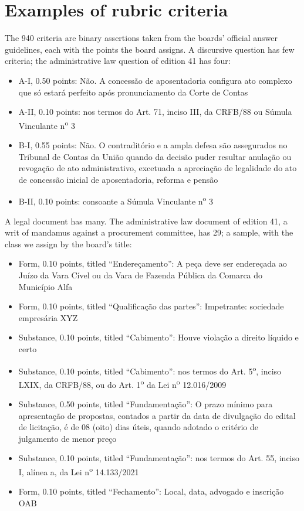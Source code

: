 \documentclass{IOS-Book-Article}
\begin{document}
\section{Examples of rubric criteria}
The 940 criteria are binary assertions taken from the boards' official answer guidelines, each with the points the board assigns. A discursive question has few criteria; the administrative law question of edition 41 has four:
\begin{itemize}
\item A-I, 0.50 points: Não. A concessão de aposentadoria configura ato complexo que só estará perfeito após pronunciamento da Corte de Contas
\item A-II, 0.10 points: nos termos do Art. 71, inciso III, da CRFB/88 ou Súmula Vinculante n\textsuperscript{o} 3
\item B-I, 0.55 points: Não. O contraditório e a ampla defesa são assegurados no Tribunal de Contas da União quando da decisão puder resultar anulação ou revogação de ato administrativo, excetuada a apreciação de legalidade do ato de concessão inicial de aposentadoria, reforma e pensão
\item B-II, 0.10 points: consoante a Súmula Vinculante n\textsuperscript{o} 3
\end{itemize}
A legal document has many. The administrative law document of edition 41, a writ of mandamus against a procurement committee, has 29; a sample, with the class we assign by the board's title:
\begin{itemize}
\item Form, 0.10 points, titled “Endereçamento”: A peça deve ser endereçada ao Juízo da Vara Cível ou da Vara de Fazenda Pública da Comarca do Município Alfa
\item Form, 0.10 points, titled “Qualificação das partes”: Impetrante: sociedade empresária XYZ
\item Substance, 0.10 points, titled “Cabimento”: Houve violação a direito líquido e certo
\item Substance, 0.10 points, titled “Cabimento”: nos termos do Art. 5\textsuperscript{o}, inciso LXIX, da CRFB/88, ou do Art. 1\textsuperscript{o} da Lei n\textsuperscript{o} 12.016/2009
\item Substance, 0.50 points, titled “Fundamentação”: O prazo mínimo para apresentação de propostas, contados a partir da data de divulgação do edital de licitação, é de 08 (oito) dias úteis, quando adotado o critério de julgamento de menor preço
\item Substance, 0.10 points, titled “Fundamentação”: nos termos do Art. 55, inciso I, alínea a, da Lei n\textsuperscript{o} 14.133/2021
\item Form, 0.10 points, titled “Fechamento”: Local, data, advogado e inscrição OAB
\end{itemize}
\end{document}

